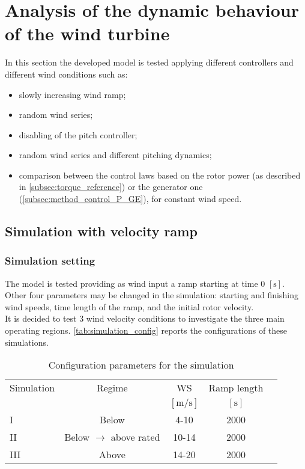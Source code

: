 \newpage
\section{Analysis of the dynamic behaviour of the wind turbine}\label{sec:c_basic_model_simulation}
In this section the developed model is tested applying different controllers and different wind conditions such as:
\begin{itemize}
  \item slowly increasing wind ramp;
  \item random wind series;
  \item disabling of the pitch controller;
  \item random wind series and different pitching dynamics;
  \item comparison between the control laws based on the rotor power (as described in \autoref{subsec:torque_reference}) or the generator one (\autoref{subsec:method_control_P_GE}), for constant wind speed.
\end{itemize}
\subsection{Simulation with velocity ramp}
\subsubsection{Simulation setting}
The model is tested providing as wind input a ramp starting at time 0 $\left[\si{\second}\right]$. Other four parameters may be changed in the simulation: starting and finishing wind speeds, time length of the ramp, and the initial rotor velocity.\\
It is decided to test 3 wind velocity conditions to investigate the three main operating regions. \autoref{tab:simulation_config} reports the configurations of these simulations. 
\begin{table}[htb]
    \caption{Configuration parameters for the simulation}
    \centering
    \begin{tabular}{lcccc}
    \toprule
      Simulation & Regime  & WS & Ramp length \\ 
       & & $\left[\si{\meter\per\second}\right]$ & $\left[\si{\second}\right]$ \\ \midrule       
       I & Below & 4-10 & 2000  \\
       II & Below $\rightarrow$ above rated & 10-14 & 2000 \\
       III & Above & 14-20 & 2000  \\
       \bottomrule
    \end{tabular}
    \label{tab:simulation_config}
\end{table}

